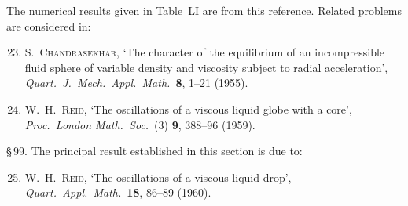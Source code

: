 The numerical results given in Table~LI are from this reference. Related problems are considered in:

\begin{enumerate}
\setcounter{enumi}{22}
\item \textsc{S.\ Chandrasekhar}, `The character of the equilibrium of an incompressible fluid sphere of variable density and viscosity subject to radial acceleration', \textit{Quart.\ J.\ Mech.\ Appl.\ Math.}\ \textbf{8}, 1--21 (1955).

\item \textsc{W.\ H.\ Reid}, `The oscillations of a viscous liquid globe with a core', \textit{Proc.\ London Math.\ Soc.}\ (3) \textbf{9}, 388--96 (1959).
\end{enumerate}

\medskip
\noindent\S\,99. The principal result established in this section is due to:

\begin{enumerate}
\setcounter{enumi}{24}
\item \textsc{W.\ H.\ Reid}, `The oscillations of a viscous liquid drop', \textit{Quart.\ Appl.\ Math.}\ \textbf{18}, 86--89 (1960).
\end{enumerate}
